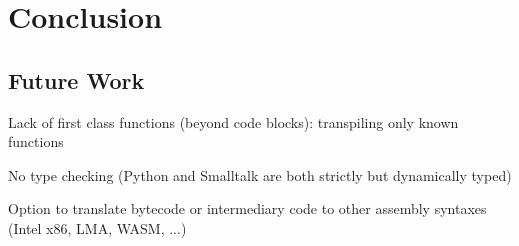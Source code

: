 
\chapter{Conclusion} \label{ch_conclusion}

\section{Future Work} \label{sc_future}

\begin{todo}
\item Lack of first class functions (beyond code blocks): transpiling only known functions
\item No type checking (Python and Smalltalk are both strictly but dynamically typed)
\item Option to translate bytecode or intermediary code to other assembly syntaxes (Intel x86, LMA, WASM, ...)
\end{todo}
